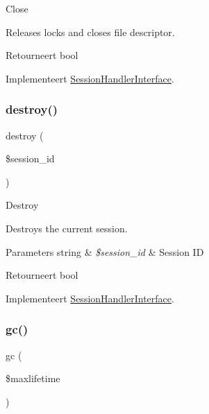 Close

Releases locks and closes file descriptor.

\begin{DoxyReturn}{Retourneert}
bool 
\end{DoxyReturn}


Implementeert \mbox{\hyperlink{interface_session_handler_interface}{Session\+Handler\+Interface}}.

\mbox{\label{class_c_i___session__files__driver_aaec5812f6b4eb6835f88d3baa06a002a}} 
\subsubsection{\texorpdfstring{destroy()}{destroy()}}
{\footnotesize\ttfamily destroy (\begin{DoxyParamCaption}\item[{}]{\$session\+\_\+id }\end{DoxyParamCaption})}

Destroy

Destroys the current session.


\begin{DoxyParams}[1]{Parameters}
string & {\em \$session\+\_\+id} & Session ID \\
\hline
\end{DoxyParams}
\begin{DoxyReturn}{Retourneert}
bool 
\end{DoxyReturn}


Implementeert \mbox{\hyperlink{interface_session_handler_interface}{Session\+Handler\+Interface}}.

\mbox{\label{class_c_i___session__files__driver_a57aff7ee0656d8aa75d545fb8b3ae35d}} 
\subsubsection{\texorpdfstring{gc()}{gc()}}
{\footnotesize\ttfamily gc (\begin{DoxyParamCaption}\item[{}]{\$maxlifetime }\end{DoxyParamCaption})}

